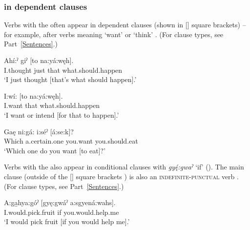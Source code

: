 \subsubsection*{ {\indefinite} in dependent clauses} \label{[a:-] indefinite in dependent clauses}
Verbs with the  {\indefinite} often appear in dependent clauses (shown in [] square brackets) -- for example, after verbs meaning ‘want’ or ‘think’ . (For clause types, see Part~\ref{Sentences}.)

\ea\label{ex:moodex8} 
\ea
\gll Ahí:ˀ giˀ [to na:yá:węh]. \\
I.thought just that what.should.happen\\
\glt ‘I just thought [that’s what should happen].’ 

\ex
\gll I:wí: [to na:yá:węh].\\
I.want that what.should.happen\\
\glt ‘I want or intend [for that to happen].’ 

\ex
\gll Gaę ni:gá: i:séˀ [á:se:k]? \\
Which a.certain.one you.want you.should.eat \\
\glt ‘Which one do you want [to eat]?’ 
\z
\z


Verbs with the  {\indefinite} also appear in conditional clauses with \textit{gyę́:gwaˀ} ‘if’ (). The main clause (outside of the [] square brackets ) is also an \textsc{indefinite-punctual} verb . (For clause types, see Part~\ref{Sentences}.)

\ea\label{ex:moodex10}
\gll A:ga̱hya:góˀ [gyę:gwáˀ a:sgyená:wahs].\\
I.would.pick.fruit if you.would.help.me\\
\glt ‘I would pick fruit [if you would help me].’ 
\z


